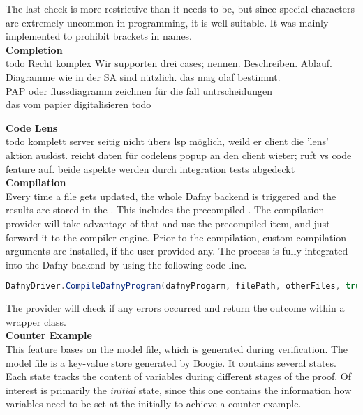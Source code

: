 The last check is more restrictive than it needs to be, but since special characters are extremely uncommon in programming, it is well suitable.
It was mainly implemented to prohibit brackets in names.\\

\textbf{Completion}\\
todo
Recht komplex
Wir supporten drei cases; nennen. Beschreiben.
Ablauf. Diagramme wie in der SA sind nützlich. das mag olaf bestimmt. \\

PAP oder flussdiagramm zeichnen für die fall untrscheidungen\\
das vom papier digitalisieren todo

\textbf{Code Lens}\\
todo
komplett server seitig nicht übers lsp möglich, weild er client die 'lens' aktion auslöst.
reicht daten für codelens popup an den client wieter; ruft vs code feature auf.
beide aspekte werden durch integration tests abgedeckt\\

\textbf{Compilation}\\
Every time a file gets updated, the whole Dafny backend is triggered and the results are stored in the .
This includes the precompiled .
The compilation provider will take advantage of that and use the precompiled item, and just forward it to the compiler engine.
Prior to the compilation, custom compilation arguments are installed, if the user provided any.
The process is fully integrated into the Dafny backend by using the following code line.\\

\begin{lstlisting}[language=csharp, caption={Calling the Dafny Compiler}, captionpos=b, label={lst:dafnycompiler}]
DafnyDriver.CompileDafnyProgram(dafnyProgarm, filePath, otherFiles, true, textwriter);
\end{lstlisting}

The provider will check if any errors occurred and return the outcome within a wrapper class.\\

\textbf{Counter Example}\\
This feature bases on the model file, which is generated during verification.
The model file is a key-value store generated by Boogie.
It contains several states.
Each state tracks the content of variables during different stages of the proof.
Of interest is primarily the \textit{initial} state, since this one contains the information how variables need to be set at the initially to achieve a counter example.\\

